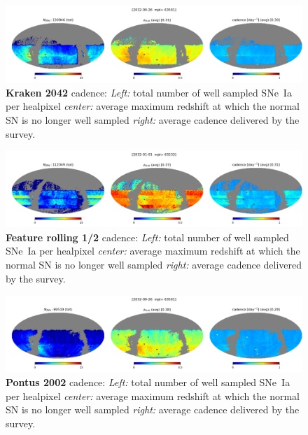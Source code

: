 \begin{figure}[h!]
  \begin{center}
    \includegraphics[width=\linewidth]{Figures/kraken_2042_64_maps.png}
    \caption{{\bf Kraken 2042} cadence: {\em Left:} total number of well
      sampled SNe~Ia per healpixel {\em center:} average maximum
      redshift at which the normal SN is no longer well sampled {\em
        right:} average cadence delivered by the survey.}
    \label{fig:kraken_2042}
  \end{center}
\end{figure}

\begin{figure}[h!]
  \begin{center}
    \includegraphics[width=\linewidth]{Figures/feature_rolling_half_mask_10yrs_64_maps.png}
    \caption{{\bf Feature rolling 1/2} cadence: {\em Left:} total number of well
      sampled SNe~Ia per healpixel {\em center:} average maximum
      redshift at which the normal SN is no longer well sampled {\em
        right:} average cadence delivered by the survey.}
    \label{fig:feature_rolling_half_mask}
  \end{center}
\end{figure}


\begin{figure}[h!]
  \begin{center}
    \includegraphics[width=\linewidth]{Figures/pontus_2002_64_maps.png}
    \caption{{\bf Pontus 2002} cadence: {\em Left:} total number of well
      sampled SNe~Ia per healpixel {\em center:} average maximum
      redshift at which the normal SN is no longer well sampled {\em
        right:} average cadence delivered by the survey.}
    \label{fig:pontus_2002}
  \end{center}
\end{figure}

